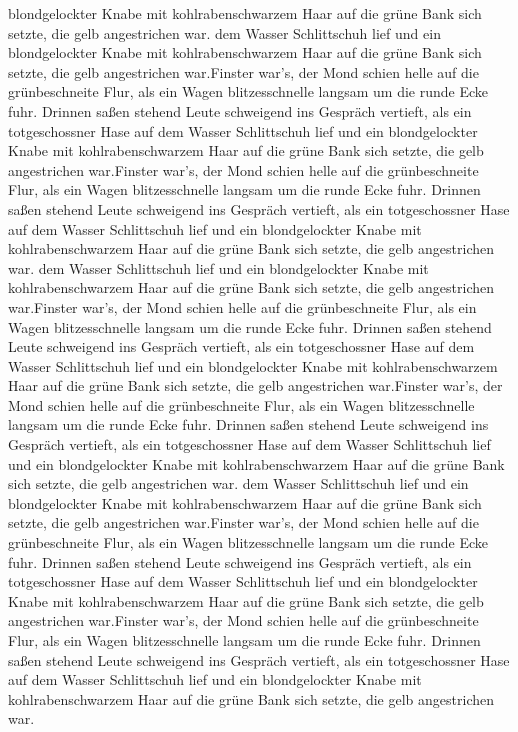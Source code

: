 \documentclass[12pt]{g-brief}
\begin{document}
\begin{g-brief}
blondgelockter Knabe mit kohlrabenschwarzem Haar auf die grüne Bank
sich setzte, die gelb angestrichen war. dem Wasser Schlittschuh lief und ein
blondgelockter Knabe mit kohlrabenschwarzem Haar auf die grüne Bank
sich setzte, die gelb angestrichen war.Finster war's, der Mond schien helle auf die grünbeschneite Flur, als
ein Wagen blitzesschnelle langsam um die runde Ecke fuhr. Drinnen
saßen stehend Leute schweigend ins Gespräch vertieft, als ein
totgeschossner Hase auf dem Wasser Schlittschuh lief und ein
blondgelockter Knabe mit kohlrabenschwarzem Haar auf die grüne Bank
sich setzte, die gelb angestrichen war.Finster war's, der Mond schien helle auf die grünbeschneite Flur, als
ein Wagen blitzesschnelle langsam um die runde Ecke fuhr. Drinnen
saßen stehend Leute schweigend ins Gespräch vertieft, als ein
totgeschossner Hase auf dem Wasser Schlittschuh lief und ein
blondgelockter Knabe mit kohlrabenschwarzem Haar auf die grüne Bank
sich setzte, die gelb angestrichen war. dem Wasser Schlittschuh lief und ein
blondgelockter Knabe mit kohlrabenschwarzem Haar auf die grüne Bank
sich setzte, die gelb angestrichen war.Finster war's, der Mond schien helle auf die grünbeschneite Flur, als
ein Wagen blitzesschnelle langsam um die runde Ecke fuhr. Drinnen
saßen stehend Leute schweigend ins Gespräch vertieft, als ein
totgeschossner Hase auf dem Wasser Schlittschuh lief und ein
blondgelockter Knabe mit kohlrabenschwarzem Haar auf die grüne Bank
sich setzte, die gelb angestrichen war.Finster war's, der Mond schien helle auf die grünbeschneite Flur, als
ein Wagen blitzesschnelle langsam um die runde Ecke fuhr. Drinnen
saßen stehend Leute schweigend ins Gespräch vertieft, als ein
totgeschossner Hase auf dem Wasser Schlittschuh lief und ein
blondgelockter Knabe mit kohlrabenschwarzem Haar auf die grüne Bank
sich setzte, die gelb angestrichen war. dem Wasser Schlittschuh lief und ein
blondgelockter Knabe mit kohlrabenschwarzem Haar auf die grüne Bank
sich setzte, die gelb angestrichen war.Finster war's, der Mond schien helle auf die grünbeschneite Flur, als
ein Wagen blitzesschnelle langsam um die runde Ecke fuhr. Drinnen
saßen stehend Leute schweigend ins Gespräch vertieft, als ein
totgeschossner Hase auf dem Wasser Schlittschuh lief und ein
blondgelockter Knabe mit kohlrabenschwarzem Haar auf die grüne Bank
sich setzte, die gelb angestrichen war.Finster war's, der Mond schien helle auf die grünbeschneite Flur, als
ein Wagen blitzesschnelle langsam um die runde Ecke fuhr. Drinnen
saßen stehend Leute schweigend ins Gespräch vertieft, als ein
totgeschossner Hase auf dem Wasser Schlittschuh lief und ein
blondgelockter Knabe mit kohlrabenschwarzem Haar auf die grüne Bank
sich setzte, die gelb angestrichen war.

 \end{g-brief}
\end{document}
